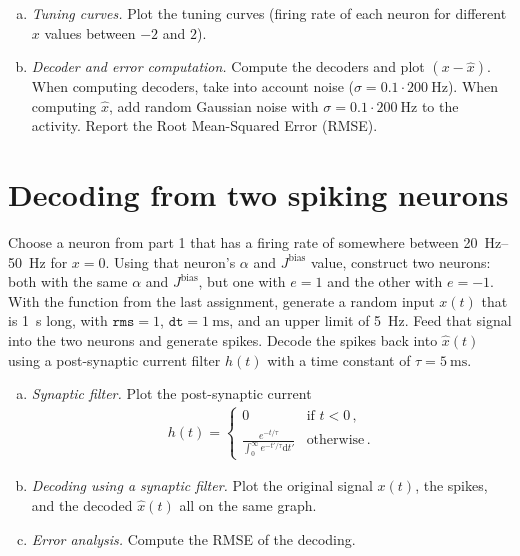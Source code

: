 	\begin{enumerate}[a)]
		\item {} \emph{Tuning curves.} Plot the tuning curves (firing rate of each neuron for different $x$ values between $-2$ and $2$).
		\item {} \emph{Decoder and error computation.} Compute the decoders and plot $(x-\hat{x})$. When computing decoders, take into account noise ($\sigma=0.1 \cdot \SI{200}{\hertz}$). When computing $\hat{x}$, add random Gaussian noise with $\sigma=0.1 \cdot \SI{200}{\hertz}$ to the activity. Report the Root Mean-Squared Error (RMSE).
	\end{enumerate}

	\section{Decoding from two spiking neurons}
	
	Choose a neuron from part 1 that has a firing rate of somewhere between \SIrange{20}{50}{\hertz} for $x=0$. Using that neuron's $\alpha$ and $J^\mathrm{bias}$ value, construct two neurons: both with the same $\alpha$ and $J^\mathrm{bias}$, but one with $e=1$ and the other with $e=-1$. With the function from the last assignment, generate a random input $x(t)$ that is \SI{1}{\second} long, with $\mathtt{rms}=1$, $\mathtt{dt}=\SI{1}{\milli\second}$, and an upper limit of \SI{5}{\hertz}. Feed that signal into the two neurons and generate spikes. Decode the spikes back into $\hat{x}(t)$ using a post-synaptic current filter $h(t)$ with a time constant of $\tau=\SI{5}{\milli\second}$.

	\begin{enumerate}[a)]
		\item {} \emph{Synaptic filter.} Plot the post-synaptic current
		\begin{align*}
			h(t)= \begin{cases}
				0 & \text{if } t < 0 \,, \\
				\frac{e^{-t/\tau}}{\int_0^\infty e^{-t'/\tau} \mathrm{d}t'} & \text{otherwise} \,.
			\end{cases}
		\end{align*}
		\item {} \emph{Decoding using a synaptic filter.} Plot the original signal $x(t)$, the spikes, and the decoded $\hat{x}(t)$ all on the same graph.
		\item {} \emph{Error analysis.} Compute the RMSE of the decoding.
	\end{enumerate}

